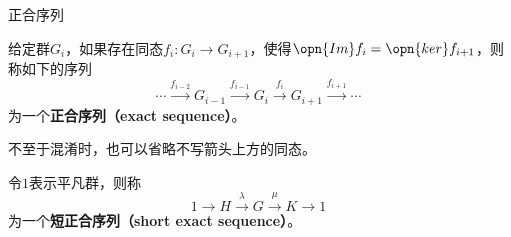 \begin{definition}{正合序列}

给定群$G_i$，如果存在同态$f_i:G_i\to G_{i+1}$，使得$\opn{Im}f_i=\opn{ker}f_{i+1}$，则称如下的序列
\begin{equation}
    \cdots \xrightarrow{f_{i-2}} G_{i-1} \xrightarrow{f_{i-1}} G_i \xrightarrow{f_i} G_{i+1} \xrightarrow{f_{i+1}}\cdots~
\end{equation}
为一个\textbf{正合序列（exact sequence）}。

不至于混淆时，也可以省略不写箭头上方的同态。

令$1$表示平凡群，则称
\begin{equation}
    1\xrightarrow{}H\xrightarrow{\lambda}G\xrightarrow{\mu}K\xrightarrow{}1~
\end{equation}
为一个\textbf{短正合序列（short exact sequence）}。

\end{definition}




































